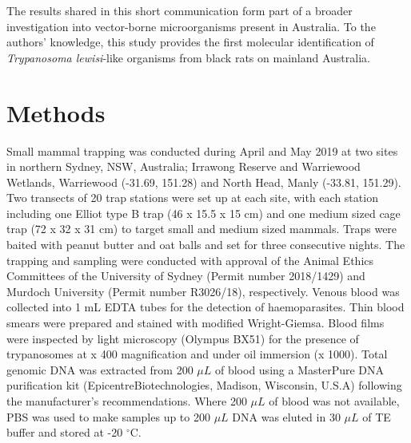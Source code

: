 \documentclass[a4paper, nobind]{templates/ociamthesis}
\begin{document}
The results shared in this short communication form part of a broader investigation into vector-borne microorganisms present in Australia. To the authors' knowledge, this study provides the first molecular identification of \emph{Trypanosoma lewisi}-like organisms from black rats on mainland Australia.

\hypertarget{methods-3}{%
\section{Methods}\label{methods-3}}

Small mammal trapping was conducted during April and May 2019 at two sites in northern Sydney, NSW, Australia; Irrawong Reserve and Warriewood Wetlands, Warriewood (-31.69, 151.28) and North Head, Manly (-33.81, 151.29). Two transects of 20 trap stations were set up at each site, with each station including one Elliot type B trap (46 x 15.5 x 15 cm) and one medium sized cage trap (72 x 32 x 31 cm) to target small and medium sized mammals. Traps were baited with peanut butter and oat balls and set for three consecutive nights. The trapping and sampling were conducted with approval of the Animal Ethics Committees of the University of Sydney (Permit number 2018/1429) and Murdoch University (Permit number R3026/18), respectively. Venous blood was collected into 1 mL EDTA tubes for the detection of haemoparasites. Thin blood smears were prepared and stained with modified Wright-Giemsa. Blood films were inspected by light microscopy (Olympus BX51) for the presence of trypanosomes at x 400 magnification and under oil immersion (x 1000). Total genomic DNA was extracted from 200 \(\mu L\) of blood using a MasterPure DNA purification kit (Epicentre\textregistered Biotechnologies, Madison, Wisconsin, U.S.A) following the manufacturer's recommendations. Where 200 \(\mu L\) of blood was not available, PBS was used to make samples up to 200 \(\mu L\) DNA was eluted in 30 \(\mu L\) of TE buffer and stored at -20 \(^\circ\)C.
\end{document}
